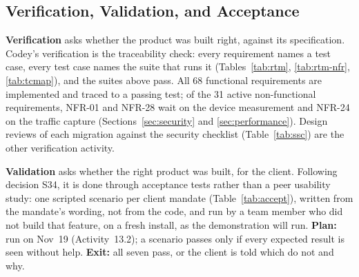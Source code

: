 \documentclass[12pt,letterpaper]{article}
\begin{document}
\subsection{Verification, Validation, and Acceptance}\label{sec:acceptance}
\textbf{Verification} asks whether the product was built right, against its
specification. Codey's verification is the traceability check: every requirement
names a test case, every test case names the suite that runs it
(Tables~\ref{tab:rtm}, \ref{tab:rtm-nfr}, \ref{tab:tcmap}), and the suites above
pass. All 68 functional requirements are implemented and traced to a passing test;
of the 31 active non-functional requirements, NFR-01 and NFR-28 wait on the device
measurement and NFR-24 on the traffic capture (Sections~\ref{sec:security} and
\ref{sec:performance}). Design reviews of each migration against the security
checklist (Table~\ref{tab:ssc}) are the other verification activity.

\textbf{Validation} asks whether the right product was built, for the client.
Following decision S34, it is done through acceptance tests rather than a peer
usability study: one scripted scenario per client mandate (Table~\ref{tab:accept}),
written from the mandate's wording, not from the code, and run by a team member who
did not build that feature, on a fresh install, as the demonstration will run.
\textbf{Plan:} run on Nov~19 (Activity~13.2); a scenario passes only if every
expected result is seen without help. \textbf{Exit:} all seven pass, or the client is
told which do not and why.
\end{document}
